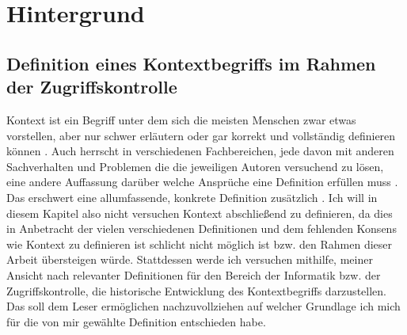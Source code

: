 \chapter{Hintergrund}%
\label{cha:background}


\section{Definition eines Kontextbegriffs im Rahmen der Zugriffskontrolle}


Kontext ist ein Begriff unter dem sich die meisten Menschen zwar etwas vorstellen, aber nur schwer erläutern oder gar korrekt und vollständig definieren können \cite{dey_understanding_2001}. Auch herrscht in verschiedenen Fachbereichen, jede davon mit anderen Sachverhalten und Problemen die die jeweiligen Autoren versuchend zu lösen, eine andere Auffassung darüber welche Ansprüche eine Definition erfüllen muss . Das erschwert eine allumfassende, konkrete Definition zusätzlich \cite{hutchison_understanding_2005}. Ich will in diesem Kapitel also nicht versuchen Kontext abschließend zu definieren, da dies in Anbetracht der vielen verschiedenen Definitionen und dem fehlenden Konsens wie  Kontext zu definieren ist \cite{wei_liu_survey_2011,alegre_engineering_2016} schlicht nicht möglich ist bzw. den Rahmen dieser Arbeit übersteigen würde. Stattdessen werde ich versuchen mithilfe, meiner Ansicht nach relevanter Definitionen für den Bereich der Informatik bzw. der Zugriffskontrolle, die historische Entwicklung des Kontextbegriffs darzustellen. Das soll  dem Leser ermöglichen nachzuvollziehen auf welcher Grundlage ich mich für die von mir gewählte Definition entschieden habe.

